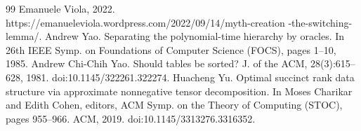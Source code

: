 \documentclass[10pt,a4paper]{article}
\begin{document}
\begin{thebibliography}{99}
 Emanuele Viola, 2022. https://emanueleviola.wordpress.com/2022/09/14/myth-creation -the-switching-lemma/.
 Andrew Yao. Separating the polynomial-time hierarchy by oracles. In 26th IEEE Symp. on Foundations of Computer Science (FOCS), pages 1–10, 1985.
 Andrew Chi-Chih Yao. Should tables be sorted? J. of the ACM, 28(3):615–628, 1981. doi:10.1145/322261.322274.
 Huacheng Yu. Optimal succinct rank data structure via approximate nonnegative tensor decomposition. In Moses Charikar and Edith Cohen, editors, ACM Symp. on the Theory of Computing (STOC), pages 955–966. ACM, 2019. doi:10.1145/3313276.3316352.
\end{thebibliography}
\end{document}
